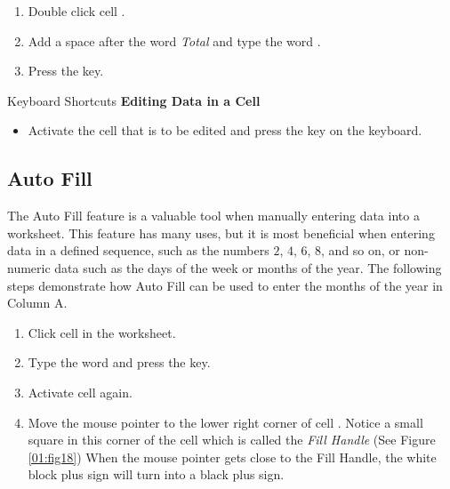 \begin{enumerate}[resume]
	\item Double click cell .
	\item Add a space after the word \textit{Total} and type the word .
	\item Press the  key.
\end{enumerate}

\begin{center}
	\begin{shtcutbox}{Keyboard Shortcuts}
		\textbf{Editing Data in a Cell}
		\\
		\begin{itemize}
			\setlength{\itemsep}{0pt}
			\setlength{\parskip}{0pt}
			\setlength{\parsep}{0pt}
			
			\item Activate the cell that is to be edited and press the  key on the keyboard.
			
		\end{itemize}
	\end{shtcutbox}
\end{center}

\subsection{Auto Fill}

The Auto Fill feature is a valuable tool when manually entering data into a worksheet. This feature has many uses, but it is most beneficial when entering data in a defined sequence, such as the numbers $ 2 $, $ 4 $, $ 6 $, $ 8 $, and so on, or non-numeric data such as the days of the week or months of the year. The following steps demonstrate how Auto Fill can be used to enter the months of the year in Column A.

\begin{enumerate}
	\item Click cell  in the  worksheet.
	\item Type the word  and press the  key.
	\item Activate cell  again.
	\item Move the mouse pointer to the lower right corner of cell . Notice a small square in this corner of the cell which is called the \textit{Fill Handle} (See Figure \ref{01:fig18}) When the mouse pointer gets close to the Fill Handle, the white block plus sign will turn into a black plus sign.
\end{enumerate}

